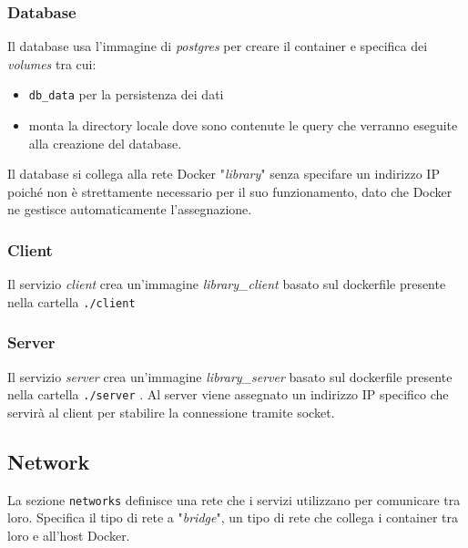 \documentclass[]{report}
\begin{document}
\subsubsection*{Database}
Il database usa l'immagine di \textit{postgres} per creare il container e specifica dei \textit{volumes} tra cui:
 \begin{itemize}
	\item \texttt{db\_data} per la persistenza dei dati
	\item monta la directory locale dove sono contenute le query che verranno eseguite alla creazione del database.
 \end{itemize}
Il database si collega alla rete Docker "\textit{library}" senza specifare un indirizzo IP poiché non è strettamente necessario per il suo funzionamento, dato che Docker ne gestisce automaticamente l'assegnazione.

\subsubsection*{Client}
Il servizio \textit{client} crea un'immagine \textit{library\_client} basato sul dockerfile presente nella cartella \texttt{./client}

\subsubsection*{Server}
Il servizio \textit{server} crea un'immagine \textit{library\_server} basato sul dockerfile presente nella cartella \texttt{./server} .\sskip
Al server viene assegnato un indirizzo IP specifico che servirà al client per stabilire la connessione tramite socket.

\subsection{Network}
La sezione \texttt{networks} definisce una rete che i servizi utilizzano per comunicare tra loro.\sskip
Specifica il tipo di rete a "\textit{bridge}", un tipo di rete che collega i container tra loro e all'host Docker.
\end{document}
